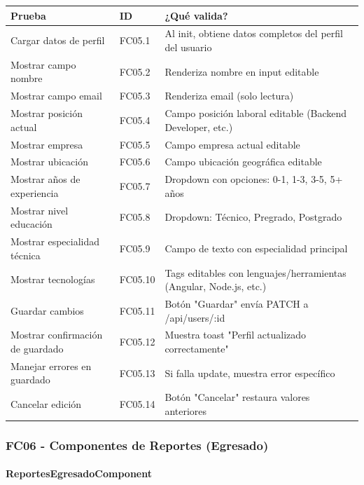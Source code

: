 \begin{table}[H]
\centering
\begin{tabular}{|l|l|p{6cm}|}
\hline
\textbf{Prueba} & \textbf{ID} & \textbf{¿Qué valida?} \\ \hline
Cargar datos de perfil & FC05.1 & Al init, obtiene datos completos del perfil del usuario \\ \hline
Mostrar campo nombre & FC05.2 & Renderiza nombre en input editable \\ \hline
Mostrar campo email & FC05.3 & Renderiza email (solo lectura) \\ \hline
Mostrar posición actual & FC05.4 & Campo posición laboral editable (Backend Developer, etc.) \\ \hline
Mostrar empresa & FC05.5 & Campo empresa actual editable \\ \hline
Mostrar ubicación & FC05.6 & Campo ubicación geográfica editable \\ \hline
Mostrar años de experiencia & FC05.7 & Dropdown con opciones: 0-1, 1-3, 3-5, 5+ años \\ \hline
Mostrar nivel educación & FC05.8 & Dropdown: Técnico, Pregrado, Postgrado \\ \hline
Mostrar especialidad técnica & FC05.9 & Campo de texto con especialidad principal \\ \hline
Mostrar tecnologías & FC05.10 & Tags editables con lenguajes/herramientas (Angular, Node.js, etc.) \\ \hline
Guardar cambios & FC05.11 & Botón "Guardar" envía PATCH a /api/users/:id \\ \hline
Mostrar confirmación de guardado & FC05.12 & Muestra toast "Perfil actualizado correctamente" \\ \hline
Manejar errores en guardado & FC05.13 & Si falla update, muestra error específico \\ \hline
Cancelar edición & FC05.14 & Botón "Cancelar" restaura valores anteriores \\ \hline
\end{tabular}
\end{table}

\subsubsection{FC06 - Componentes de Reportes (Egresado)}

\paragraph{ReportesEgresadoComponent}

